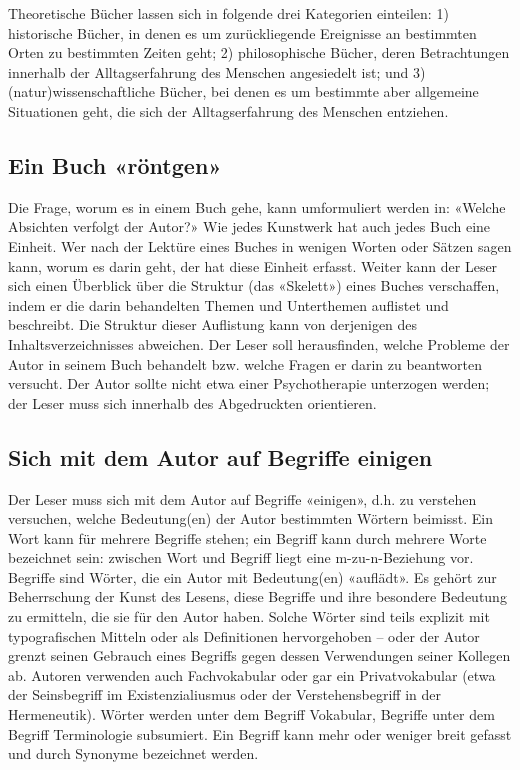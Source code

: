 \documentclass[a4paper,11pt]{scrartcl}
\begin{document}
Theoretische Bücher lassen sich in folgende drei Kategorien einteilen: 1) historische Bücher, in denen es um zurückliegende Ereignisse an bestimmten Orten zu bestimmten Zeiten geht; 2) philosophische Bücher, deren Betrachtungen innerhalb der Alltagserfahrung des Menschen angesiedelt ist; und 3) (natur)wissenschaftliche Bücher, bei denen es um bestimmte aber allgemeine Situationen geht, die sich der Alltagserfahrung des Menschen entziehen.

\subsection{Ein Buch «röntgen»}

Die Frage, worum es in einem Buch gehe, kann umformuliert werden in: «Welche Absichten verfolgt der Autor?» Wie jedes Kunstwerk hat auch jedes Buch eine Einheit. Wer nach der Lektüre eines Buches in wenigen Worten oder Sätzen sagen kann, worum es darin geht, der hat diese Einheit erfasst. Weiter kann der Leser sich einen Überblick über die Struktur (das «Skelett») eines Buches verschaffen, indem er die darin behandelten Themen und Unterthemen auflistet und beschreibt. Die Struktur dieser Auflistung kann von derjenigen des Inhaltsverzeichnisses abweichen. Der Leser soll herausfinden, welche Probleme der Autor in seinem Buch behandelt bzw. welche Fragen er darin zu beantworten versucht. Der Autor sollte nicht etwa einer Psychotherapie unterzogen werden; der Leser muss sich innerhalb des Abgedruckten orientieren.

\subsection{Sich mit dem Autor auf Begriffe einigen}

Der Leser muss sich mit dem Autor auf Begriffe «einigen», d.h. zu verstehen versuchen, welche Bedeutung(en) der Autor bestimmten Wörtern beimisst. Ein Wort kann für mehrere Begriffe stehen; ein Begriff kann durch mehrere Worte bezeichnet sein: zwischen Wort und Begriff liegt eine m-zu-n-Beziehung vor. Begriffe sind Wörter, die ein Autor mit Bedeutung(en) «auflädt». Es gehört zur Beherrschung der Kunst des Lesens, diese Begriffe und ihre besondere Bedeutung zu ermitteln, die sie für den Autor haben. Solche Wörter sind teils explizit mit typografischen Mitteln oder als Definitionen hervorgehoben – oder der Autor grenzt seinen Gebrauch eines Begriffs gegen dessen Verwendungen seiner Kollegen ab. Autoren verwenden auch Fachvokabular oder gar ein Privatvokabular (etwa der Seinsbegriff im Existenzialiusmus oder der Verstehensbegriff in der Hermeneutik). Wörter werden unter dem Begriff Vokabular, Begriffe unter dem Begriff Terminologie subsumiert. Ein Begriff kann mehr oder weniger breit gefasst und durch Synonyme bezeichnet werden.
\end{document}
